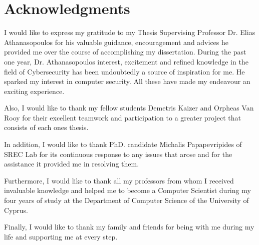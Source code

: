 \section*{\LARGE{Acknowledgments}}

I would like to express my gratitude to my Thesis Supervising Professor Dr. Elias Athanasopoulos for his valuable guidance, encouragement and advices he provided me over the course of accomplishing my dissertation. During the past one year, Dr. Athanasopoulos interest, excitement and refined knowledge in the field of Cybersecurity has been undoubtedly a source of inspiration for me. He sparked my interest in computer security. All these have made my endeavour an exciting experience. 

Also, I would like to thank my fellow students Demetris Kaizer and Orpheas Van Rooy for their excellent teamwork and participation to a greater project that consists of each ones thesis.

In addition, I would like to thank PhD. candidate Michalis Papapevripides of SREC Lab for its continuous response to any issues that arose and for the assistance it provided me in resolving them.

Furthermore, I would like to thank all my professors from whom I received invaluable knowledge and helped me to become a Computer Scientist during my four years of study at the Department of Computer Science of the University of Cyprus.

Finally, I would like to thank my family and friends for being with me during my life and
supporting me at every step.